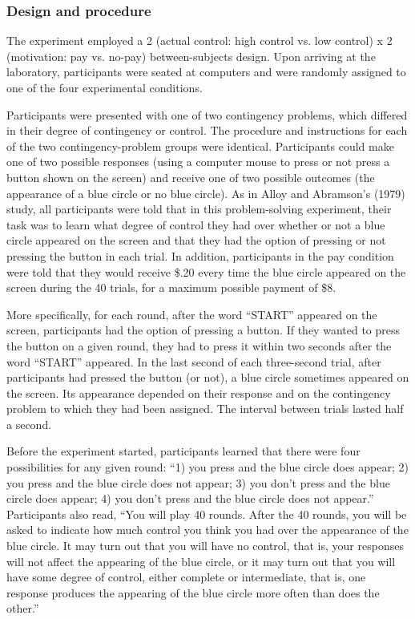 \documentclass[USenglish,letterpaper,12pt,extrafontsizes,oneside,onecolumn,final]{memoir}
\begin{document}
\subsubsection{Design and procedure}
The experiment employed a 2 (actual control: high control vs. low control) x 2 (motivation: pay vs. no-pay) between-subjects design. Upon arriving at the laboratory, participants were seated at computers and were randomly assigned to one of the four experimental conditions. 

Participants were presented with one of two contingency problems, which differed in their degree of contingency or control. The procedure and 
instructions for each of the two contingency-problem groups were identical. Participants could make one of two possible responses (using a computer mouse to press or not press a button shown on the screen) and receive one of two possible outcomes (the appearance of a blue circle or no blue circle). As in Alloy and Abramson's (1979) study, all participants were told that in this problem-solving experiment, their task was to learn what degree of control they had over whether or not a blue circle appeared on the screen and that they had the option of pressing or not pressing the button in each trial. In addition, participants in the pay condition were told that they would receive \$.20 every time the blue circle appeared on the screen during the 40 trials, for a maximum possible payment of \$8. 

More specifically, for each round, after the word ``START'' appeared on the screen, participants had the option of pressing a button. If they wanted to press the button on a given round, they had to press it within two seconds after the word ``START'' appeared. In the last second of each three-second trial, after participants had pressed the button (or not), a blue circle sometimes appeared on the screen. Its appearance depended on their response and on the contingency problem to which they had been assigned. The interval between trials lasted half a second.  

Before the experiment started, participants learned that there were four possibilities for any given round: ``1) you press and the blue circle does appear; 2) you press and the blue circle does not appear; 3) you don't press and the blue circle does appear; 4) you don't press and the blue circle does not appear.'' Participants also read, ``You will play 40 rounds. After the 40 rounds, you will be asked to indicate how much control you think you had over the appearance of the blue circle. It may turn out that you will have no control, that is, your responses will not affect the appearing of the blue circle, or it may turn out that you will have some degree of control, either complete or intermediate, that is, one response produces the appearing of the blue circle more often than does the other.''
\end{document}

